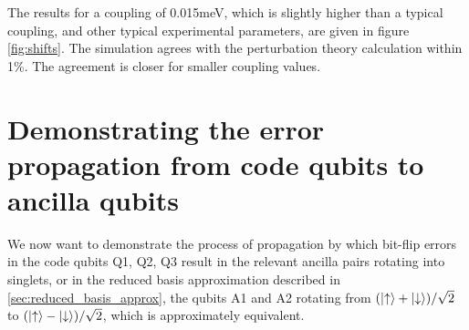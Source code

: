 \documentclass{report}
\begin{document}
The results for a coupling of 0.015\unit{\milli\electronvolt}, which is slightly higher than a typical coupling, and other typical experimental parameters, are given in figure \ref{fig:shifts}. The simulation agrees with the perturbation theory calculation within 1\%. The agreement is closer for smaller coupling values.

\section{Demonstrating the error propagation from code qubits to ancilla qubits}
We now want to demonstrate the process of propagation by which bit-flip errors in the code qubits Q1, Q2, Q3 result in the relevant ancilla pairs rotating into singlets, or in the reduced basis approximation described in \ref{sec:reduced_basis_approx}, the qubits A1 and A2 rotating from $(\ket{\uparrow} + \ket{\downarrow})/\sqrt{2}$ to $(\ket{\uparrow} - \ket{\downarrow})/\sqrt{2}$, which is approximately equivalent.
\end{document}
